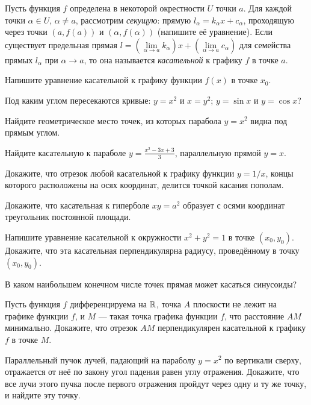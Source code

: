 \documentclass[a4paper,12pt]{article}
\begin{document}


Пусть функция $f$ определена в некоторой окрестности $U$ точки $a$.
Для каждой точки $\alpha\in U$, $\alpha\ne a$, рассмотрим {\em секущую}: прямую $l_\alpha=k_\alpha x +c_\alpha$, проходящую
через точки $(a,f(a))$ и $(\alpha,f(\alpha))$ (напишите её уравнение).
Если существует предельная прямая $l=(\lim\limits_{\alpha\to a} k_\alpha)x + (\lim\limits_{\alpha\to a} c_\alpha)$ для семейства прямых $l_\alpha$
при $\alpha\to a$, то она называется {\em касательной} к графику
$f$ в точке $a$. %

Напишите уравнение касательной к графику функции $f(x)$ в точке $x_0$.


Под каким углом пересекаются кривые:
$y=x^2$ и $x=y^2$;
$y=\sin x$ и $y=\cos x$?

Найдите геометрическое место точек, из которых парабола $y=x^2$
видна под прямым углом.

Найдите касательную к параболе $y=\frac{x^2-3x+3}3$, параллельную прямой
$y=x$.

Докажите, что отрезок любой касательной к графику функции $y=1/x$,
концы которого расположены на осях координат, делится точкой касания
пополам.


Докажите, что касательная к гиперболе $xy=a^2$ образует с осями координат
треугольник постоянной площади.

  Напишите уравнение касательной к окружности $x^2+y^2=1$ в точке $(x_0,y_0)$.
 Докажите, что эта касательная перпендикулярна радиусу, проведённому в точку $(x_0,y_0)$.

В каком наибольшем конечном числе точек прямая может касаться синусоиды?


 Пусть функция $f$ дифференцируема на $\mathbb{R}$, точка $A$ плоскости
не лежит на графике функции $f$, и $M$ --- такая точка графика
функции $f$, что расстояние $AM$ минимально. Докажите, что отрезок
$AM$ перпендикулярен касательной к графику $f$ в точке $M$.

Параллельный пучок лучей, падающий на параболу $y=x^2$ по
вертикали сверху, отражается от не\"е по закону
 угол падения равен углу отражения.
Докажите, что все лучи этого пучка после первого отражения
пройдут через одну и ту же точку, и найдите эту точку.
\end{document}
